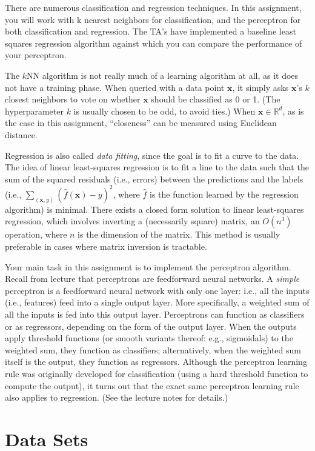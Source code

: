\documentclass{article}
\begin{document}
There are numerous classification and regression techniques. In this assignment, you will work with k nearest neighbors for classification, and the perceptron for both classification and regression. The TA's have implemented a baseline least squares regression algorithm against which you can compare the performance of your perceptron.


The $k$NN algorithm is not really much of a learning algorithm at all,
as it does not have a training phase.
When queried with a data point $\bm{x}$,
it simply asks $\bm{x}$'s $k$ closest neighbors to vote on whether $\bm{x}$ should be classified as 0 or 1.
(The hyperparameter $k$ is usually chosen to be odd, to avoid ties.)
When $\bm{x} \in \mathbb{R}^d$, as is the case in this assignment,
``closeness'' can be measured using Euclidean distance.

Regression is also called \emph{data fitting}, since the goal is to fit a curve to the data.
The idea of linear least-squares regression is to fit a line to the data
such that the sum of the squared residuals (i.e., errors)
between the predictions and the labels (i.e., $\sum_{(\bm{x}, y)} (\hat{f}(\bm{x}) - y)^2$,
where $\hat{f}$ is the function learned by the regression algorithm) is minimal.
There exists a closed form solution to linear least-squares regression,
which involves inverting a (necessarily square) matrix,
an $O(n^3)$ operation, where $n$ is the dimension of the matrix.
This method is usually preferable in cases where matrix inversion is tractable.

Your main task in this assignment is to implement the perceptron algorithm.
Recall from lecture that perceptrons are feedforward neural networks.
A \emph{simple\/} perceptron is a feedforward neural network with only one layer:
i.e., all the inputs (i.e., features) feed into a single output layer.
More specifically, a weighted sum of all the inputs is fed into this output layer.
Perceptrons can function as classifiers or as regressors, depending on the form of the output layer.
When the outputs apply threshold functions (or smooth variants thereof: e.g., sigmoidals) to the weighted sum,
they function as classifiers;
alternatively, when the weighted sum itself is the output, they function as regressors.
Although the perceptron learning rule was originally developed for classification
(using a hard threshold function to compute the output),
it turns out that the exact same perceptron learning rule also applies to regression.
(See the lecture notes for details.)


\section{Data Sets}
\end{document}
